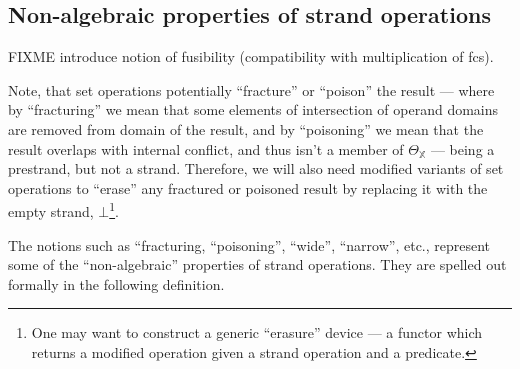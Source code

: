 \documentclass [a4paper,12pt] {article}
\theoremstyle{definition}
\begin{document}
\subsection {Non-algebraic properties of strand operations}

FIXME introduce notion of fusibility (compatibility with
multiplication of fcs).

Note, that set operations potentially ``fracture'' or ``poison'' the
result --- where by ``fracturing'' we mean that some elements of
intersection of operand domains are removed from domain of the result,
and by ``poisoning'' we mean that the result overlaps with internal
conflict, and thus isn't a member of $\Theta_{\mathbb X}$ --- being a
prestrand, but not a strand.  Therefore, we will also need modified
variants of set operations to ``erase'' any fractured or poisoned
result by replacing it with the empty strand, $\bm{\bot}$\footnote{One
  may want to construct a generic ``erasure'' device --- a functor
  which returns a modified operation given a strand operation and a
  predicate.}.

The notions such as ``fracturing, ``poisoning'', ``wide'', ``narrow'',
etc., represent some of the ``non-algebraic'' properties of strand
operations.  They are spelled out formally in the following
definition.
\end{document}

